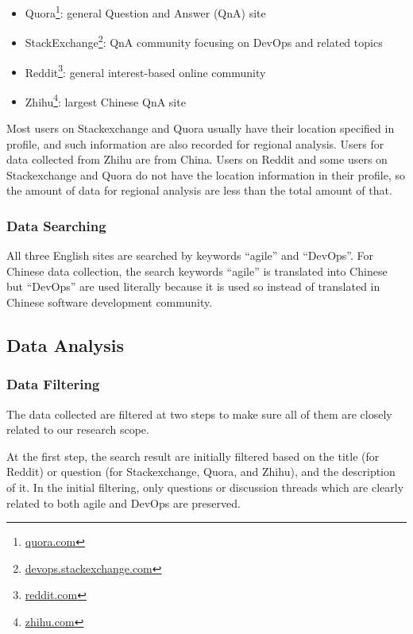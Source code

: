 \documentclass[
  12pt,
  a4paper,
]{article}
\providecommand{\tightlist}{%
  \setlength{\itemsep}{0pt}\setlength{\parskip}{0pt}}
\begin{document}
\begin{itemize}
\tightlist
\item
  Quora\footnote{\url{quora.com}}: general Question and Answer (QnA)
  site
\item
  StackExchange\footnote{\url{devops.stackexchange.com}}: QnA community
  focusing on DevOps and related topics
\item
  Reddit\footnote{\url{reddit.com}}: general interest-based online
  community
\item
  Zhihu\footnote{\url{zhihu.com}}: largest Chinese QnA site
\end{itemize}

Most users on Stackexchange and Quora usually have their location
specified in profile, and such information are also recorded for
regional analysis. Users for data collected from Zhihu are from China.
Users on Reddit and some users on Stackexchange and Quora do not have
the location information in their profile, so the amount of data for
regional analysis are less than the total amount of that.

\hypertarget{data-searching}{%
\subsubsection{Data Searching}\label{data-searching}}

All three English sites are searched by keywords ``agile'' and
``DevOps''. For Chinese data collection, the search keywords ``agile''
is translated into Chinese but ``DevOps'' are used literally because it
is used so instead of translated in Chinese software development
community.

\hypertarget{data-analysis}{%
\subsection{Data Analysis}\label{data-analysis}}

\hypertarget{data-filtering}{%
\subsubsection{Data Filtering}\label{data-filtering}}

The data collected are filtered at two steps to make sure all of them
are closely related to our research scope.

At the first step, the search result are initially filtered based on the
title (for Reddit) or question (for Stackexchange, Quora, and Zhihu),
and the description of it. In the initial filtering, only questions or
discussion threads which are clearly related to both agile and DevOps
are preserved.
\end{document}
